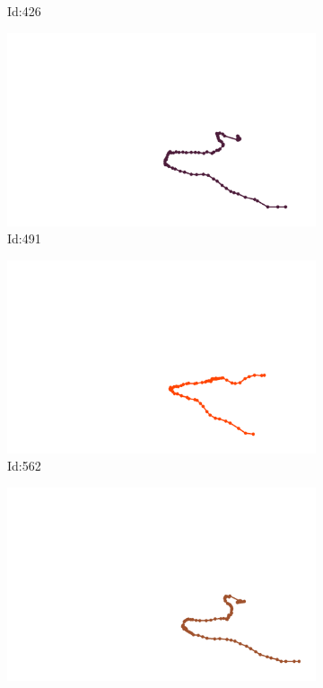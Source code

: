 \documentclass[12pt,twoside]{report}
\begin{document}
\begin{figure}
\begin{subfigure}[b]{0.20\textwidth}
\caption{Id:426}
\end{subfigure}
\begin{subfigure}[b]{0.20\textwidth}
\centering
\includegraphics[width=\textwidth]{../../trajectories/491.png}
\caption{Id:491}
\end{subfigure}
\begin{subfigure}[b]{0.20\textwidth}
\centering
\includegraphics[width=\textwidth]{../../trajectories/562.png}
\caption{Id:562}
\end{subfigure}
\begin{subfigure}[b]{0.20\textwidth}
\centering
\includegraphics[width=\textwidth]{../../trajectories/607.png}

\end{subfigure}
\end{figure}
\end{document}
